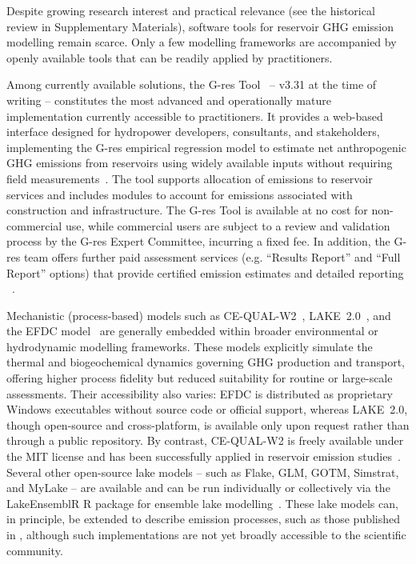 \documentclass[review, authoryear, 1p]{elsarticle} %
\begin{document}
Despite growing research interest and practical relevance (see the historical review in Supplementary Materials), software tools for reservoir \ac{GHG} emission modelling remain scarce.
Only a few modelling frameworks are accompanied by openly available tools that can be readily applied by practitioners.

Among currently available solutions, the G-res Tool~\cite{Prairie2017b,prairie2017gres} -- v3.31 at the time of writing -- constitutes the most advanced and operationally mature implementation currently accessible to practitioners.
It provides a web-based interface designed for hydropower developers, consultants, and stakeholders, implementing the G-res empirical regression model to estimate net anthropogenic \ac{GHG} emissions from reservoirs using widely available inputs without requiring field measurements~\citep{Prairie2021}. 
The tool supports allocation of emissions to reservoir services and includes modules to account for emissions associated with construction and infrastructure.
The G-res Tool is available at no cost for non-commercial use, while commercial users are subject to a review and validation process by the G-res Expert Committee, incurring a fixed fee.
In addition, the G-res team offers further paid assessment services (e.g. ``Results Report'' and ``Full Report'' options) that provide certified emission estimates and detailed reporting ~\citep{prairie2017gres}.

Mechanistic (process-based) models such as CE-QUAL-W2~\citep{Berger2014}, LAKE~2.0~\citep{Lomov2024, Stepanenko2016}, and the \ac{EFDC} model~\citep{hamrick1992, SHI2025} are generally embedded within broader environmental or hydrodynamic modelling frameworks.
These models explicitly simulate the thermal and biogeochemical dynamics governing \ac{GHG} production and transport, offering higher process fidelity but reduced suitability for routine or large-scale assessments.
Their accessibility also varies: \ac{EFDC} is distributed as proprietary Windows executables without source code or official support, whereas LAKE~2.0, though open-source and cross-platform, is available only upon request rather than through a public repository.
By contrast, CE-QUAL-W2 is freely available under the MIT license and has been successfully applied in reservoir emission studies~\cite{Berger2014, Wu2022}.
Several other open-source lake models -- such as Flake, GLM, GOTM, Simstrat, and MyLake -- are available and can be run individually or collectively via the LakeEnsemblR R package for ensemble lake modelling~\cite{Moore2021}.
These lake models can, in principle, be extended to describe emission processes, such as those published in \cite{Soued2020exp}, although such implementations are not yet broadly accessible to the scientific community.
\end{document}
